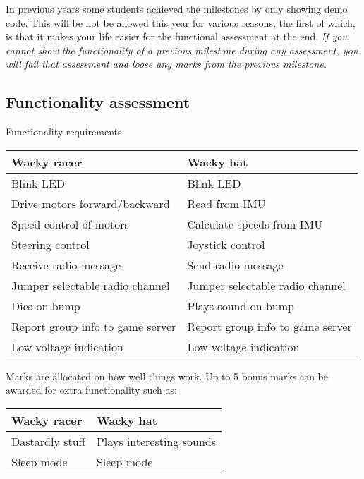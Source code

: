 \documentclass[11pt, a4paper]{article}
\begin{document}
In previous years some students achieved the milestones by only
showing demo code.  This will be not be allowed this year for various
reasons, the first of which, is that it makes your life easier for the
functional assessment at the end. \emph{If you cannot show the
  functionality of a previous milestone during any assessment, you
  will fail that assessment and loose any marks from the previous
  milestone.}


\subsection{Functionality assessment}

Functionality requirements:
%
\begin{flushleft}
  \begin{tabular}{l|l}
    Wacky racer & Wacky hat \\ \hline \hline
    Blink LED                      & Blink LED \\
    Drive motors forward/backward  & Read from IMU \\
    Speed control of motors        & Calculate speeds from IMU \\
    Steering control               & Joystick control \\
    Receive radio message          & Send radio message \\
    Jumper selectable radio channel & Jumper selectable radio channel  \\    
    Dies on bump                   & Plays sound on bump \\
    Report group info to game server & Report group info to game server \\
    Low voltage indication         & Low voltage indication \\
  \end{tabular}
\end{flushleft}
%
Marks are allocated on how well things work.  Up to 5 bonus marks can
be awarded for extra functionality such as:
%
\begin{flushleft}
  \begin{tabular}{l|l}
    Wacky racer                & Wacky hat \\ \hline \hline
    Dastardly stuff            & Plays interesting sounds \\
    Sleep mode                 & Sleep mode \\
  \end{tabular}
\end{flushleft}
\end{document}
